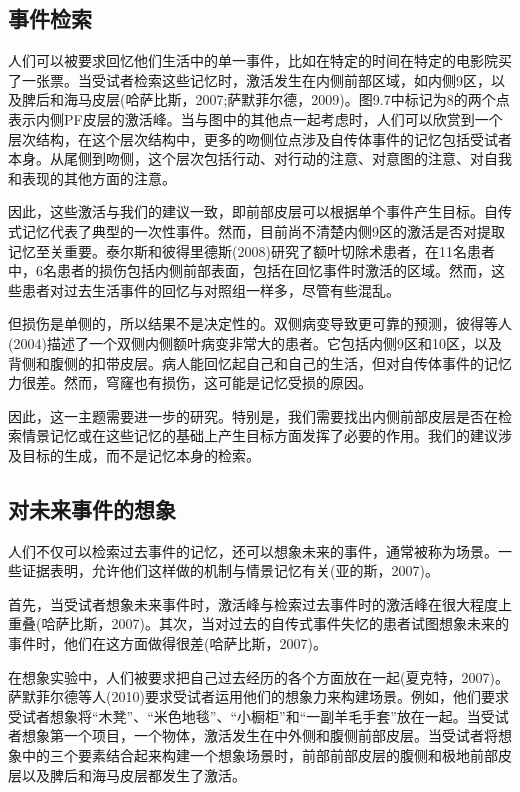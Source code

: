 \subsection{事件检索}
人们可以被要求回忆他们生活中的单一事件，比如在特定的时间在特定的电影院买了一张票。当受试者检索这些记忆时，激活发生在内侧前部区域，如内侧9区，以及脾后和海马皮层(哈萨比斯，2007;萨默菲尔德，2009)。图9.7中标记为8的两个点表示内侧PF皮层的激活峰。当与图中的其他点一起考虑时，人们可以欣赏到一个层次结构，在这个层次结构中，更多的吻侧位点涉及自传体事件的记忆包括受试者本身。从尾侧到吻侧，这个层次包括行动、对行动的注意、对意图的注意、对自我和表现的其他方面的注意。
\par
因此，这些激活与我们的建议一致，即前部皮层可以根据单个事件产生目标。自传式记忆代表了典型的一次性事件。然而，目前尚不清楚内侧9区的激活是否对提取记忆至关重要。泰尔斯和彼得里德斯(2008)研究了额叶切除术患者，在11名患者中，6名患者的损伤包括内侧前部表面，包括在回忆事件时激活的区域。然而，这些患者对过去生活事件的回忆与对照组一样多，尽管有些混乱。
\par
但损伤是单侧的，所以结果不是决定性的。双侧病变导致更可靠的预测，彼得等人(2004)描述了一个双侧内侧额叶病变非常大的患者。它包括内侧9区和10区，以及背侧和腹侧的扣带皮层。病人能回忆起自己和自己的生活，但对自传体事件的记忆力很差。然而，穹窿也有损伤，这可能是记忆受损的原因。
\par
因此，这一主题需要进一步的研究。特别是，我们需要找出内侧前部皮层是否在检索情景记忆或在这些记忆的基础上产生目标方面发挥了必要的作用。我们的建议涉及目标的生成，而不是记忆本身的检索。
\par
\subsection{对未来事件的想象}
\par
人们不仅可以检索过去事件的记忆，还可以想象未来的事件，通常被称为场景。一些证据表明，允许他们这样做的机制与情景记忆有关(亚的斯，2007)。

首先，当受试者想象未来事件时，激活峰与检索过去事件时的激活峰在很大程度上重叠(哈萨比斯，2007)。其次，当对过去的自传式事件失忆的患者试图想象未来的事件时，他们在这方面做得很差(哈萨比斯，2007)。

在想象实验中，人们被要求把自己过去经历的各个方面放在一起(夏克特，2007)。萨默菲尔德等人(2010)要求受试者运用他们的想象力来构建场景。例如，他们要求受试者想象将“木凳”、“米色地毯”、“小橱柜”和“一副羊毛手套”放在一起。当受试者想象第一个项目，一个物体，激活发生在中外侧和腹侧前部皮层。当受试者将想象中的三个要素结合起来构建一个想象场景时，前部前部皮层的腹侧和极地前部皮层以及脾后和海马皮层都发生了激活。

